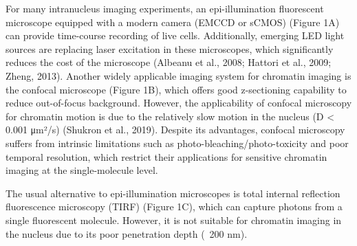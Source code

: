 For many intranucleus imaging experiments, an epi-illumination fluorescent microscope equipped with a modern camera (EMCCD or sCMOS) (Figure 1A) can provide time-course recording of live cells. Additionally, emerging LED light sources are replacing laser excitation in these microscopes, which significantly reduces the cost of the microscope (Albeanu et al., 2008; Hattori et al., 2009; Zheng, 2013). Another widely applicable imaging system for chromatin imaging is the confocal microscope (Figure 1B), which offers good z-sectioning capability to reduce out-of-focus background. However, the applicability of confocal microscopy for chromatin motion is due to the relatively slow motion in the nucleus (D < 0.001 μm²/s) (Shukron et al., 2019). Despite its advantages, confocal microscopy suffers from intrinsic limitations such as photo-bleaching/photo-toxicity and poor temporal resolution, which restrict their applications for sensitive chromatin imaging at the single-molecule level.

The usual alternative to epi-illumination microscopes is total internal reflection fluorescence microscopy (TIRF) (Figure 1C), which can capture photons from a single fluorescent molecule. However, it is not suitable for chromatin imaging in the nucleus due to its poor penetration depth (~200 nm).

